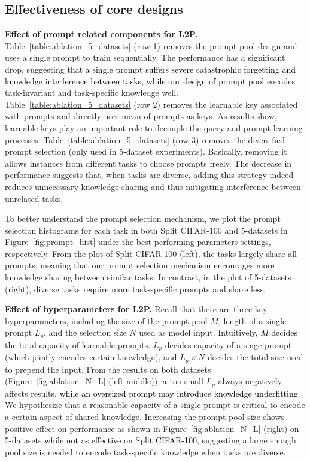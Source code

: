\documentclass[10pt,twocolumn,letterpaper]{article}
\newcommand{\finalx}[1]{\textcolor{black}{#1}}
\newcommand{\methodabbr}{L2P\xspace}
\begin{document}
\subsection{Effectiveness of core designs} \label{sec:ablation}

\textbf{Effect of prompt related components for \methodabbr.}
Table~\ref{table:ablation_5_datasets} (row 1) removes the prompt pool design and uses a single prompt to train sequentially. The performance has a significant drop, suggesting that \finalx{a single prompt suffers severe catastrophic forgetting and knowledge interference between tasks, while our design of} prompt pool encodes task-invariant and task-specific knowledge well. Table~\ref{table:ablation_5_datasets} (row 2) removes the learnable key associated with prompts and directly uses mean of prompts as keys. %
As results show, learnable keys play an important role to decouple the query and prompt learning processes. Table~\ref{table:ablation_5_datasets} (row 3) removes the diversified prompt selection (only used in 5-dataset experiments). Basically, removing it allows instances from different tasks to choose prompts freely. The decrease in performance suggests that, when tasks are diverse, adding this strategy indeed reduces unnecessary knowledge sharing and thus mitigating interference between unrelated tasks.




To better understand the prompt selection mechanism, we plot the prompt selection histograms for each task in both Split CIFAR-100 and 5-datasets in Figure~\ref{fig:prompt_hist} under the best-performing parameters settings, respectively.
From the plot of Split CIFAR-100 (left), the tasks largely share all prompts, meaning that our prompt selection mechanism encourages more knowledge sharing between similar tasks. 
In contrast, in the plot of 5-datasets (right), diverse tasks require more task-specific prompts and share less.





\textbf{Effect of hyperparameters for \methodabbr.} 
Recall that there are three key hyperparameters, including the size of the prompt pool $M$, length of a single prompt $L_p$, and the selection size $N$ used as model input. 
Intuitively, $M$ decides the total capacity of learnable prompts. 
$L_p$ decides capacity of a singe prompt (which jointly encodes certain knowledge), and $L_p \times N$ decides the total size used to prepend the input.
From the results on both datasets (Figure~\ref{fig:ablation_N_L} (left-middle)), a too small $L_p$ always negatively affects results, \finalx{while an oversized prompt may introduce knowledge underfitting.}
We hypothesize that a reasonable capacity of a single prompt is critical to encode a certain aspect of shared knowledge. 
Increasing the prompt pool size shows positive effect on performance as shown in Figure~\ref{fig:ablation_N_L} (right) on 5-datasets \finalx{while not as effective on Split CIFAR-100}, suggesting a large enough pool size is needed to encode task-specific knowledge when tasks are diverse.
\end{document}

